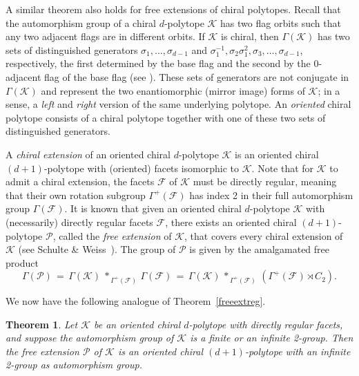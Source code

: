 \documentclass[12pt]{amsart}
\newtheorem{theorem}{Theorem}[section]
\theoremstyle{definition}
\begin{document}
A similar theorem also holds for free extensions of chiral polytopes. Recall that the automorphism group of a chiral $d$-polytope $\mathcal K$ has two flag orbits such that any two adjacent flags are in different orbits. If $\mathcal K$ is chiral, then $\Gamma(\mathcal{K})$ has two sets of distinguished generators $\sigma_1,\ldots,\sigma_{d-1}$ and $\sigma_1^{-1},\sigma_{2}\sigma_{1}^{2},\sigma_{3},\ldots,\sigma_{d-1}$, respectively, the first determined by the base flag and the second by the $0$-adjacent flag of the base flag (see \cite{Pel2025,SchWei1991}). These sets of generators are not conjugate in $\Gamma(\mathcal{K})$ and represent the two enantiomorphic (mirror image) forms of $\mathcal{K}$; in a sense, a {\it left\/} and {\it right\/} version of the same underlying polytope. An {\it oriented\/} chiral polytope consists of a chiral polytope together with one of these two sets of distinguished generators. 

A {\em chiral extension\/} of an oriented chiral $d$-polytope $\mathcal K$ is an oriented chiral $(d+1)$-polytope with (oriented) facets isomorphic to $\mathcal K$. Note that for $\mathcal K$ to admit a chiral extension, the facets $\mathcal F$ of $\mathcal K$ must be directly regular, meaning that their own rotation subgroup $\Gamma^{+}(\mathcal{F})$ has index 2 in their full automorphism group $\Gamma(\mathcal{F})$. It is known that given an oriented chiral $d$-polytope $\mathcal K$ with (necessarily) directly regular facets $\mathcal F$, there exists an oriented chiral $(d+1)$-polytope $\mathcal P$, called the {\em free extension} of $\mathcal{K}$, that covers every chiral extension of $\mathcal K$ (see Schulte \& Weiss~\cite{SchWei1995}). The group of $\mathcal P$ is given by the amalgamated free product 
\begin{equation}
\label{amalchir}
\Gamma(\mathcal{P}) 
\,=\,\Gamma(\mathcal{K})\ {\mathop{\ast}}_{\,\Gamma^{+}(\mathcal{F})} \,\Gamma(\mathcal{F})
\,=\,\Gamma(\mathcal{K})\, {\mathop{\ast}}_{\,\Gamma^{+}(\mathcal{F})} \,
(\Gamma^{+}(\mathcal{F})\rtimes C_2).
\end{equation}

We now have the following analogue of Theorem~\ref{freeextreg}.

\begin{theorem}
\label{freeextchir}
Let $\mathcal K$ be an oriented chiral $d$-polytope with directly regular facets, and suppose the automorphism group of $\mathcal K$ is a finite or an infinite 2-group. Then the free extension $\mathcal P$ of $\mathcal K$ is an oriented chiral $(d+1)$-polytope with an infinite 2-group as automorphism group.
\end{theorem}
\end{document}
